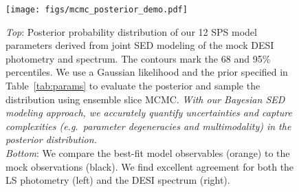 \begin{figure}
\begin{center}
    \texttt{[image: figs/mcmc\_posterior\_demo.pdf]}
    \caption{
        \emph{Top}: 
        Posterior probability distribution of our 12 SPS model parameters
        derived from joint SED modeling of the mock DESI photometry and
        spectrum.
        The contours mark the 68 and 95\% percentiles.
        We use a Gaussian likelihood and the prior specified in
        Table~\ref{tab:params} to evaluate the posterior and sample the
        distribution using ensemble slice MCMC. 
        \emph{With our Bayesian SED modeling approach, we accurately quantify
        uncertainties and capture complexities (\emph{e.g.}~parameter
        degeneracies and multimodality) in the posterior distribution.}\\
        \emph{Bottom}: 
        We compare the best-fit model observables (orange) to the mock
        observations (black).  
        We find excellent agreement for both the LS photometry (left) and the
        DESI spectrum (right). 
    } \label{fig:posterior}
\end{center}
\end{figure}


